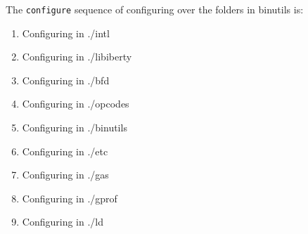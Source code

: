 The \texttt{configure} sequence of configuring over the folders in binutils is:
\begin{enumerate}[noitemsep]
\item Configuring in ./intl
\item Configuring in ./libiberty
\item Configuring in ./bfd
\item Configuring in ./opcodes
\item Configuring in ./binutils
\item Configuring in ./etc
\item Configuring in ./gas
\item Configuring in ./gprof
\item Configuring in ./ld
\end{enumerate}

